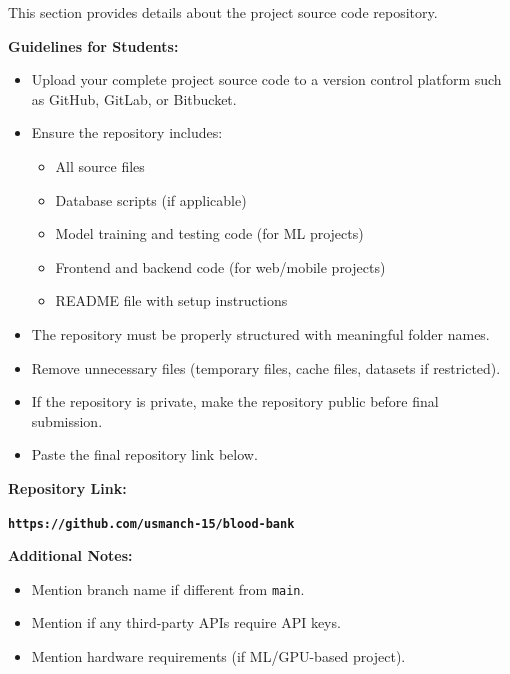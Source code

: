 This section provides details about the project source code repository.

\textbf{Guidelines for Students:}

\begin{itemize}
    \item Upload your complete project source code to a version control platform 
    such as GitHub, GitLab, or Bitbucket.
    
    \item Ensure the repository includes:
    \begin{itemize}
        \item All source files
        \item Database scripts (if applicable)
        \item Model training and testing code (for ML projects)
        \item Frontend and backend code (for web/mobile projects)
        \item README file with setup instructions
    \end{itemize}
    
    \item The repository must be properly structured with meaningful folder names.
    
    \item Remove unnecessary files (temporary files, cache files, datasets if restricted).
    
    \item If the repository is private, make the repository public before final submission.
    
    \item Paste the final repository link below.
\end{itemize}

\vspace{1cm}

\textbf{Repository Link:}

\begin{center}
\textbf{\texttt{https://github.com/usmanch-15/blood-bank}}
\end{center}

\vspace{1cm}

\textbf{Additional Notes:}

\begin{itemize}
    \item Mention branch name if different from \texttt{main}.
    \item Mention if any third-party APIs require API keys.
    \item Mention hardware requirements (if ML/GPU-based project).
\end{itemize}
